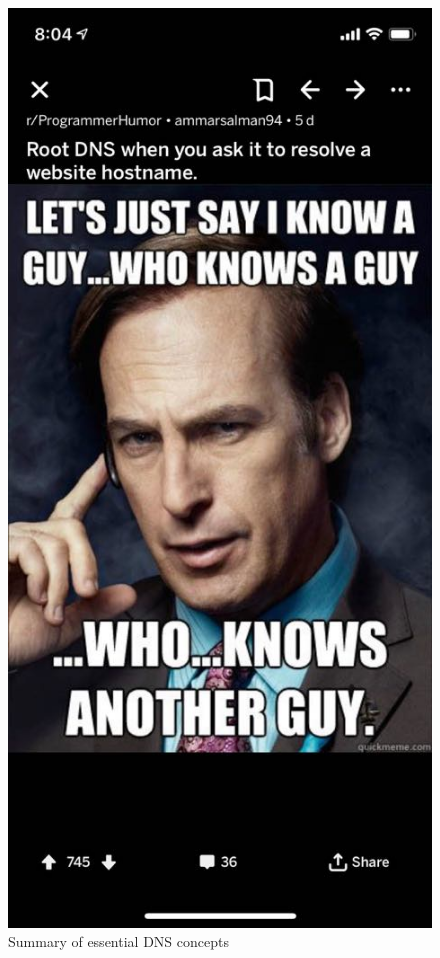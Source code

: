 \documentclass{article}
\begin{document}
\begin{description}
    \begin{figure}[H]
        \includegraphics[scale=0.5]{images/dns_summary.jpg}
        \centering
        \caption{Summary of essential DNS concepts}
    \end{figure}    
    
\end{description}
\end{document}
